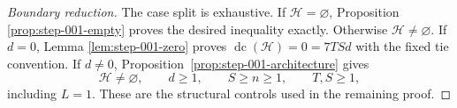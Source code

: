 \begin{proof}[Boundary reduction]
The case split is exhaustive.  If $\mathcal H=\varnothing$, Proposition
\ref{prop:step-001-empty} proves the desired inequality exactly.  Otherwise
$\mathcal H\neq\varnothing$.  If $d=0$, Lemma
\ref{lem:step-001-zero} proves
$\operatorname{dc}(\mathcal H)=0=7TSd$ with the fixed tie convention.  If
$d\neq0$, Proposition~\ref{prop:step-001-architecture} gives
\[
\mathcal H\neq\varnothing,
\qquad
d\geq1,
\qquad
S\geq n\geq1,
\qquad
T,S\geq1,
\]
including $L=1$.  These are the structural controls used in the remaining
proof.
\end{proof}
